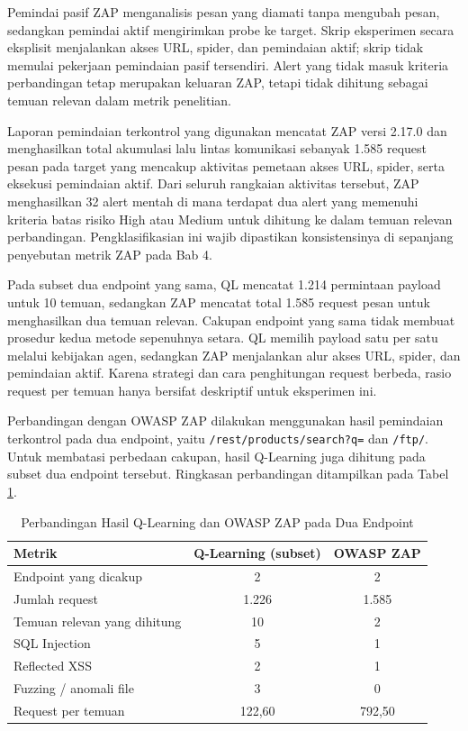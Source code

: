 \begin{enumerate}
Pemindai pasif ZAP menganalisis pesan yang diamati tanpa mengubah pesan, sedangkan pemindai aktif mengirimkan probe ke target. Skrip eksperimen secara eksplisit menjalankan akses URL, spider, dan pemindaian aktif; skrip tidak memulai pekerjaan pemindaian pasif tersendiri. Alert yang tidak masuk kriteria perbandingan tetap merupakan keluaran ZAP, tetapi tidak dihitung sebagai temuan relevan dalam metrik penelitian.

Laporan pemindaian terkontrol yang digunakan mencatat ZAP versi 2.17.0 dan menghasilkan total akumulasi lalu lintas komunikasi sebanyak 1.585 request pesan pada target yang mencakup aktivitas pemetaan akses URL, spider, serta eksekusi pemindaian aktif. Dari seluruh rangkaian aktivitas tersebut, ZAP menghasilkan 32 alert mentah di mana terdapat dua alert yang memenuhi kriteria batas risiko High atau Medium untuk dihitung ke dalam temuan relevan perbandingan. Pengklasifikasian ini wajib dipastikan konsistensinya di sepanjang penyebutan metrik ZAP pada Bab 4.

Pada subset dua endpoint yang sama, QL mencatat 1.214 permintaan payload untuk 10 temuan, sedangkan ZAP mencatat total 1.585 request pesan untuk menghasilkan dua temuan relevan. Cakupan endpoint yang sama tidak membuat prosedur kedua metode sepenuhnya setara. QL memilih payload satu per satu melalui kebijakan agen, sedangkan ZAP menjalankan alur akses URL, spider, dan pemindaian aktif. Karena strategi dan cara penghitungan request berbeda, rasio request per temuan hanya bersifat deskriptif untuk eksperimen ini.

Perbandingan dengan OWASP ZAP dilakukan menggunakan hasil pemindaian terkontrol pada dua endpoint, yaitu \texttt{/rest/products/search?q=} dan \texttt{/ftp/}. Untuk membatasi perbedaan cakupan, hasil Q-Learning juga dihitung pada subset dua endpoint tersebut. Ringkasan perbandingan ditampilkan pada Tabel \ref{tab:zap_comparison}.

\begin{table}[H]
\centering
\caption{Perbandingan Hasil Q-Learning dan OWASP ZAP pada Dua Endpoint}
\label{tab:zap_comparison}
\begin{tabular}{|l|c|c|}
\hline
\textbf{Metrik} & \textbf{Q-Learning (subset)} & \textbf{OWASP ZAP} \\
\hline
Endpoint yang dicakup & 2 & 2 \\
Jumlah request & 1.226 & 1.585 \\
Temuan relevan yang dihitung & 10 & 2 \\
SQL Injection & 5 & 1 \\
Reflected XSS & 2 & 1 \\
Fuzzing / anomali file & 3 & 0 \\
Request per temuan & 122,60 & 792,50 \\
\hline
\end{tabular}
\end{table}


\end{enumerate}
